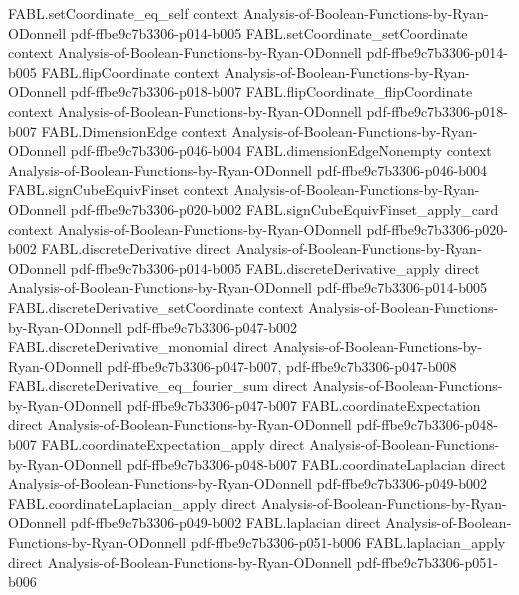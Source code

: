 \begin{theorem}
  {FABL.setCoordinate_eq_self}
  {context}
  {Analysis-of-Boolean-Functions-by-Ryan-ODonnell}
  {pdf-ffbe9c7b3306-p014-b005}
\proofstep
  {FABL.setCoordinate_setCoordinate}
  {context}
  {Analysis-of-Boolean-Functions-by-Ryan-ODonnell}
  {pdf-ffbe9c7b3306-p014-b005}
\proofstep
  {FABL.flipCoordinate}
  {context}
  {Analysis-of-Boolean-Functions-by-Ryan-ODonnell}
  {pdf-ffbe9c7b3306-p018-b007}
\proofstep
  {FABL.flipCoordinate_flipCoordinate}
  {context}
  {Analysis-of-Boolean-Functions-by-Ryan-ODonnell}
  {pdf-ffbe9c7b3306-p018-b007}
\proofstep
  {FABL.DimensionEdge}
  {context}
  {Analysis-of-Boolean-Functions-by-Ryan-ODonnell}
  {pdf-ffbe9c7b3306-p046-b004}
\proofstep
  {FABL.dimensionEdgeNonempty}
  {context}
  {Analysis-of-Boolean-Functions-by-Ryan-ODonnell}
  {pdf-ffbe9c7b3306-p046-b004}
\proofstep
  {FABL.signCubeEquivFinset}
  {context}
  {Analysis-of-Boolean-Functions-by-Ryan-ODonnell}
  {pdf-ffbe9c7b3306-p020-b002}
\proofstep
  {FABL.signCubeEquivFinset_apply_card}
  {context}
  {Analysis-of-Boolean-Functions-by-Ryan-ODonnell}
  {pdf-ffbe9c7b3306-p020-b002}
\proofstep
  {FABL.discreteDerivative}
  {direct}
  {Analysis-of-Boolean-Functions-by-Ryan-ODonnell}
  {pdf-ffbe9c7b3306-p014-b005}
\proofstep
  {FABL.discreteDerivative_apply}
  {direct}
  {Analysis-of-Boolean-Functions-by-Ryan-ODonnell}
  {pdf-ffbe9c7b3306-p014-b005}
\proofstep
  {FABL.discreteDerivative_setCoordinate}
  {context}
  {Analysis-of-Boolean-Functions-by-Ryan-ODonnell}
  {pdf-ffbe9c7b3306-p047-b002}
\proofstep
  {FABL.discreteDerivative_monomial}
  {direct}
  {Analysis-of-Boolean-Functions-by-Ryan-ODonnell}
  {pdf-ffbe9c7b3306-p047-b007,
    pdf-ffbe9c7b3306-p047-b008}
\proofstep
  {FABL.discreteDerivative_eq_fourier_sum}
  {direct}
  {Analysis-of-Boolean-Functions-by-Ryan-ODonnell}
  {pdf-ffbe9c7b3306-p047-b007}
\proofstep
  {FABL.coordinateExpectation}
  {direct}
  {Analysis-of-Boolean-Functions-by-Ryan-ODonnell}
  {pdf-ffbe9c7b3306-p048-b007}
\proofstep
  {FABL.coordinateExpectation_apply}
  {direct}
  {Analysis-of-Boolean-Functions-by-Ryan-ODonnell}
  {pdf-ffbe9c7b3306-p048-b007}
\proofstep
  {FABL.coordinateLaplacian}
  {direct}
  {Analysis-of-Boolean-Functions-by-Ryan-ODonnell}
  {pdf-ffbe9c7b3306-p049-b002}
\proofstep
  {FABL.coordinateLaplacian_apply}
  {direct}
  {Analysis-of-Boolean-Functions-by-Ryan-ODonnell}
  {pdf-ffbe9c7b3306-p049-b002}
\proofstep
  {FABL.laplacian}
  {direct}
  {Analysis-of-Boolean-Functions-by-Ryan-ODonnell}
  {pdf-ffbe9c7b3306-p051-b006}
\proofstep
  {FABL.laplacian_apply}
  {direct}
  {Analysis-of-Boolean-Functions-by-Ryan-ODonnell}
  {pdf-ffbe9c7b3306-p051-b006}

\end{theorem}
